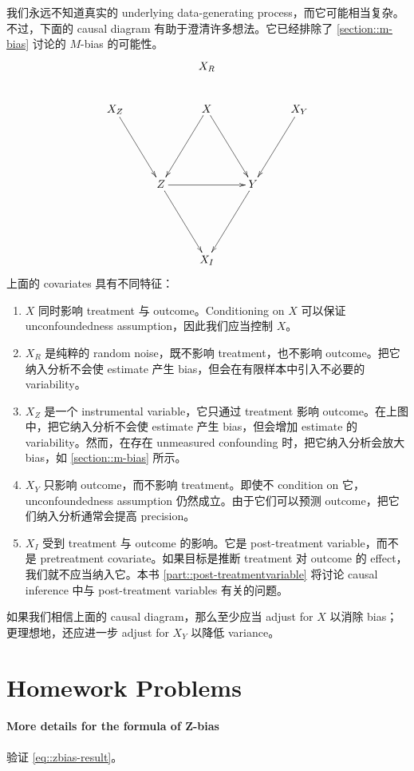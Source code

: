 我们永远不知道真实的 underlying data-generating process，而它可能相当复杂。不过，下面的 causal diagram 有助于澄清许多想法。它已经排除了 \cref{section::m-bias} 讨论的 $M$-bias 的可能性。
$$
\xymatrix{
 &&X_R&& \\
X_Z \ar[ddr] && X \ar[ddl] \ar[ddr]&& X_Y \ar[ddl] \\
 &\\
 &Z \ar[rr] \ar[ddr] &&Y \ar[ddl]& \\
 & \\
 &&X_I&&
}
$$
上面的 covariates 具有不同特征：
\begin{enumerate}
\item
$X$ 同时影响 treatment 与 outcome。Conditioning on $X$ 可以保证 unconfoundedness assumption，因此我们应当控制 $X$。
\item
$X_R$ 是纯粹的 random noise，既不影响 treatment，也不影响 outcome。把它纳入分析不会使 estimate 产生 bias，但会在有限样本中引入不必要的 variability。
\item
$X_Z$ 是一个 instrumental variable，它只通过 treatment 影响 outcome。在上图中，把它纳入分析不会使 estimate 产生 bias，但会增加 estimate 的 variability。然而，在存在 unmeasured confounding 时，把它纳入分析会放大 bias，如 \cref{section::m-bias} 所示。
\item
$X_Y$ 只影响 outcome，而不影响 treatment。即使不 condition on 它，unconfoundedness assumption 仍然成立。由于它们可以预测 outcome，把它们纳入分析通常会提高 precision。
\item
$X_I$ 受到 treatment 与 outcome 的影响。它是 post-treatment variable，而不是 pretreatment covariate。如果目标是推断 treatment 对 outcome 的 effect，我们就不应当纳入它。本书 \cref{part::post-treatmentvariable} 将讨论 causal inference 中与 post-treatment variables 有关的问题。
\end{enumerate}



如果我们相信上面的 causal diagram，那么至少应当 adjust for $X$ 以消除 bias；更理想地，还应进一步 adjust for $X_Y$ 以降低 variance。


 
 
 
\section{Homework Problems}


\paragraph{More details for the formula of Z-bias}\label{hw::z-bias-formula}
验证 \eqref{eq::zbias-result}。
 

